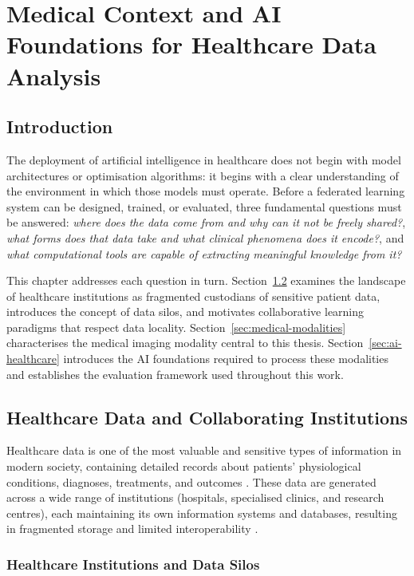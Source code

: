 \chapter{Medical Context and AI Foundations for Healthcare Data Analysis}
\section{Introduction}
The deployment of artificial intelligence in healthcare does not begin with model
architectures or optimisation algorithms: it begins with a clear understanding of
the environment in which those models must operate.
Before a federated learning system can be designed, trained, or evaluated, three
fundamental questions must be answered: \textit{where does the data come from and
why can it not be freely shared?}, \textit{what forms does that data take and what
clinical phenomena does it encode?}, and \textit{what computational tools are capable
of extracting meaningful knowledge from it?}

This chapter addresses each question in turn.
Section~\ref{sec:healthcare-data} examines the landscape of healthcare institutions
as fragmented custodians of sensitive patient data, introduces the concept of data
silos, and motivates collaborative learning paradigms that respect data locality.
Section~\ref{sec:medical-modalities} characterises the medical imaging modality
central to this thesis.
Section~\ref{sec:ai-healthcare} introduces the AI foundations required to process
these modalities and establishes the evaluation framework used throughout this work.

\section{Healthcare Data and Collaborating Institutions}
\label{sec:healthcare-data}

Healthcare data is one of the most valuable and sensitive types of information in
modern society, containing detailed records about patients' physiological conditions,
diagnoses, treatments, and outcomes \cite{olivia2026secure}.
These data are generated across a wide range of institutions (hospitals, specialised
clinics, and research centres), each maintaining its own information systems and
databases, resulting in fragmented storage and limited interoperability \cite{jensen2012mining}.

\subsection{Healthcare Institutions and Data Silos}

